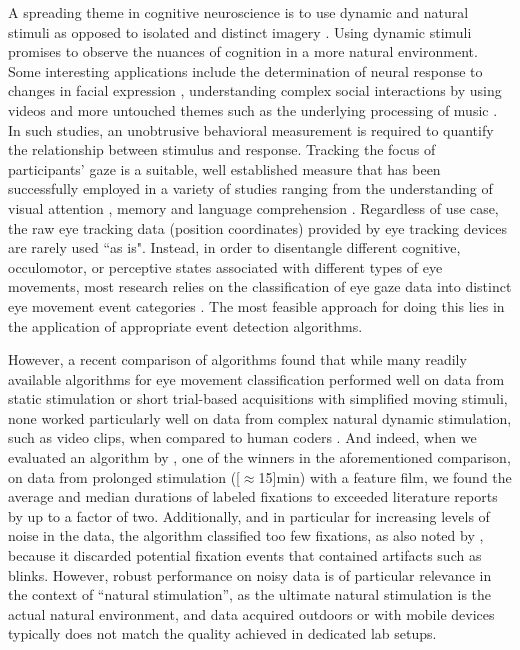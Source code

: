 A spreading theme in cognitive neuroscience is to use dynamic and natural
stimuli as opposed to isolated and distinct imagery \citep{real_world}. Using
dynamic stimuli promises to observe the nuances of cognition in a more natural
environment. Some interesting applications include the determination of neural
response to changes in facial expression \citep{Harris2014}, understanding
complex social interactions by using videos \citep{Tikka2012} and more
untouched themes such as the underlying processing of music
\citep{Toiviainen2014}. In such studies, an unobtrusive behavioral measurement
is required to quantify the relationship between stimulus and response.
Tracking the focus of participants' gaze is a suitable, well established
measure that has been successfully employed in a variety of studies ranging
from the understanding of visual attention \citep{HantaoLiu2011}, memory
\citep{Hannula2010} and language comprehension \citep{Gordon2006}.
%
Regardless of use case, the raw eye tracking data (position coordinates)
provided by eye tracking devices are rarely used ``as is". Instead, in order
to disentangle different cognitive, occulomotor, or perceptive states
associated with different types of eye movements, most research relies on the
classification of eye gaze data into distinct eye movement event categories
\citep{Schutz2011}. The most feasible approach for doing this lies in the
application of appropriate event detection algorithms.

However, a recent comparison of algorithms found that while many readily
available algorithms for eye movement classification performed well on data
from static stimulation or short trial-based acquisitions with simplified
moving stimuli, none worked particularly well on data from complex natural
dynamic stimulation, such as video clips, when compared to human coders
\citep{Andersson2017}.
%
And indeed, when we evaluated an algorithm by \citet{Nystrom2010AnData}, one of
the winners in the aforementioned comparison, on data from prolonged
stimulation (\unit[$\approx$15]{min}) with a feature film, we found the
average and median durations of labeled fixations to exceeded literature
reports \citep[\eg][]{holmqvist2011eye,dorr2010variability} by up to a factor
of two.  Additionally, and in particular for increasing levels of noise in the
data, the algorithm classified too few fixations, as also noted by
\citet{Friedman2018}, because it discarded potential fixation events that
contained artifacts such as blinks.
%
However, robust performance on noisy data is of particular relevance in the
context of ``natural stimulation'', as the ultimate natural stimulation is the
actual natural environment, and data acquired outdoors or with mobile
devices typically does not match the quality achieved in dedicated lab
setups.

